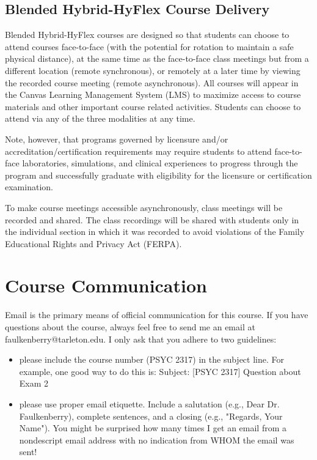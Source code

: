 \documentclass[10pt]{article}
\begin{document}
\subsection*{Blended Hybrid-HyFlex Course Delivery}
\label{sec:org6cc726b}
Blended Hybrid-HyFlex courses are designed so that students can choose to attend courses face-to-face (with the potential for rotation to maintain a safe physical distance), at the same time as the face-to-face class meetings but from a different location (remote synchronous), or remotely at a later time by viewing the recorded course meeting (remote asynchronous). All courses will appear in the Canvas Learning Management System (LMS) to maximize access to course materials and other important course related activities. Students can choose to attend via any of the three modalities at any time.

Note, however, that programs governed by licensure and/or accreditation/certification requirements may require students to attend face-to-face laboratories, simulations, and clinical experiences to progress through the program and successfully graduate with eligibility for the licensure or certification examination.

To make course meetings accessible asynchronously, class meetings will be recorded and shared. The class recordings will be shared with students only in the individual section in which it was recorded to avoid violations of the Family Educational Rights and Privacy Act (FERPA).

\section*{Course Communication}
\label{sec:org6376677}

Email is the primary means of official communication for this course.  If you have questions about the course, always feel free to send me an email at faulkenberry@tarleton.edu.  I only ask that you adhere to two guidelines:
\begin{itemize}
\item please include the course number (PSYC 2317) in the subject line.  For example, one good way to do this is:  Subject: [PSYC 2317] Question about Exam 2
\item please use proper email etiquette.  Include a salutation (e.g., Dear Dr. Faulkenberry), complete sentences, and a closing (e.g., "Regards, Your Name").  You might be surprised how many times I get an email from a nondescript email address with no indication from WHOM the email was sent!
\end{itemize}
\end{document}
